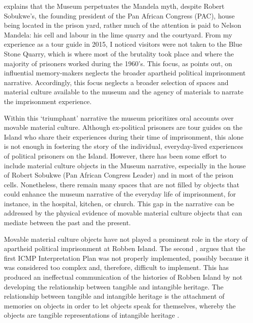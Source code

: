 
\textcite{Solani_2000} explains that the Museum perpetuates the Mandela myth, despite Robert Sobukwe’s, the founding president of the Pan African Congress (PAC), house being located in the prison yard, rather much of the attention is paid to Nelson Mandela: his cell and labour in the lime quarry and the courtyard. From my experience as a tour guide in 2015, I noticed visitors were not taken to the Blue Stone Quarry, which is where most of the brutality took place and where the majority of prisoners worked during the 1960's. This focus, as \textcite{Rioufol_1999} points out, on influential memory-makers neglects the broader apartheid political imprisonment narrative. Accordingly, this focus neglects a broader selection of spaces and material culture available to the museum and the agency of materials to narrate the imprisonment experience.

Within this ‘triumphant’ narrative the museum prioritizes oral accounts over movable material culture. Although ex-political prisoners are tour guides on the Island who share their experiences during their time of imprisonment, this alone is not enough in fostering the story of the individual, everyday-lived experiences of political prisoners on the Island. However, there has been some effort to include material culture objects in the Museum narrative, especially in the house of Robert Sobukwe (Pan African Congress Leader) and in most of the prison cells. Nonetheless, there remain many spaces that are not filled by objects that could enhance the museum narrative of the everyday life of imprisonment, for instance, in the hospital, kitchen, or church. This gap in the narrative can be addressed by the physical evidence of movable material culture objects that can mediate between the past and the present.

Movable material culture objects have not played a prominent role in the story of apartheid political imprisonment at Robben Island. The second \textcite{Robben_2013}, argues that the first ICMP Interpretation Plan was not properly implemented, possibly because it was considered too complex and, therefore, difficult to implement. This has produced an ineffectual communication of the histories of Robben Island by not developing the relationship between tangible and intangible heritage. The relationship between tangible and intangible heritage is the attachment of memories on objects in order to let objects speak for themselves, whereby the objects are tangible representations of intangible heritage \parencite{Hoskins_2006}.

